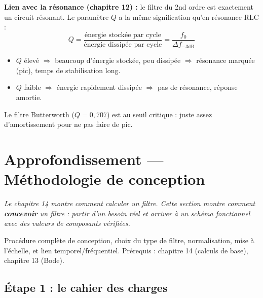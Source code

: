 \documentclass[12pt,a4paper,twoside]{book}
\begin{document}
\begin{intuition}
\textbf{Lien avec la résonance (chapitre 12) :} le filtre du 2nd ordre est exactement un circuit résonant. Le paramètre $Q$ a la même signification qu'en résonance RLC :
\[
Q = \frac{\text{énergie stockée par cycle}}{\text{énergie dissipée par cycle}} = \frac{f_0}{\Delta f_{-3\text{dB}}}
\]
\begin{itemize}[nosep]
\item $Q$ élevé $\Rightarrow$ beaucoup d'énergie stockée, peu dissipée $\Rightarrow$ résonance marquée (pic), temps de stabilisation long.
\item $Q$ faible $\Rightarrow$ énergie rapidement dissipée $\Rightarrow$ pas de résonance, réponse amortie.
\end{itemize}
Le filtre Butterworth ($Q = 0{,}707$) est au seuil critique : juste assez d'amortissement pour ne pas faire de pic.
\end{intuition}

\section{Approfondissement --- Méthodologie de conception}

\vspace{0.3cm}
\textit{Le chapitre 14 montre comment calculer un filtre. Cette section montre comment \textbf{concevoir} un filtre : partir d'un besoin réel et arriver à un schéma fonctionnel avec des valeurs de composants vérifiées.}
\vspace{0.3cm}

\begin{approfondissement}
Procédure complète de conception, choix du type de filtre, normalisation, mise à l'échelle, et lien temporel/fréquentiel. Prérequis : chapitre 14 (calculs de base), chapitre 13 (Bode).
\end{approfondissement}

\subsection{Étape 1 : le cahier des charges}
\end{document}
